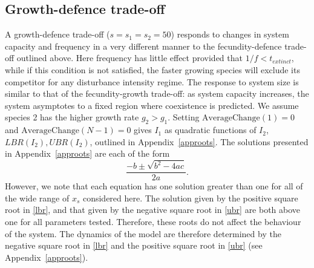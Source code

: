 \subsection{Growth-defence trade-off}
A growth-defence trade-off ($s=s_1=s_2=50$) responds to changes in system capacity and frequency in a very different manner to the fecundity-defence trade-off outlined above. Here frequency has little effect provided that $1/f<t_{extinct}$, while if this condition is not satisfied, the faster growing species will exclude its competitor for any disturbance intensity regime. The response to system size is similar to that of the fecundity-growth trade-off: as system capacity increases, the system asymptotes to a fixed region where coexistence is predicted. We assume species 2 has the higher growth rate $g_2>g_1$. Setting $\text{AverageChange}(1)=0$ and $\text{AverageChange}(N-1)=0$ gives $I_1$ as quadratic functions of $I_2$, $LBR(I_2), UBR(I_2)$, outlined in Appendix~\ref{approots}.
The solutions presented in Appendix~\ref{approots} are each of the form
$$
\frac{-b\pm \sqrt{b^2-4ac}}{2a}.
$$ 
However, we note that each equation has one solution greater than one for all of the wide range of $x_s$ considered here. The solution given by the positive square root in \eqref{lbr}, and that given by the negative square root in \eqref{ubr} are both above one for all parameters tested. Therefore, these roots do not affect the behaviour of the system. The dynamics of the model are therefore determined by the negative square root in \eqref{lbr} and the positive square root in \eqref{ubr} (see Appendix~\ref{approots}).
